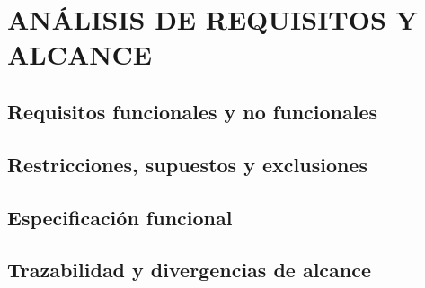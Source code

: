 \setcounter{subsection}{0}
\section{ANÁLISIS DE REQUISITOS Y ALCANCE}


\subsection{Requisitos funcionales y no funcionales}

\subsection{Restricciones, supuestos y exclusiones}

\subsection{Especificación funcional}

\subsection{Trazabilidad y divergencias de alcance}
